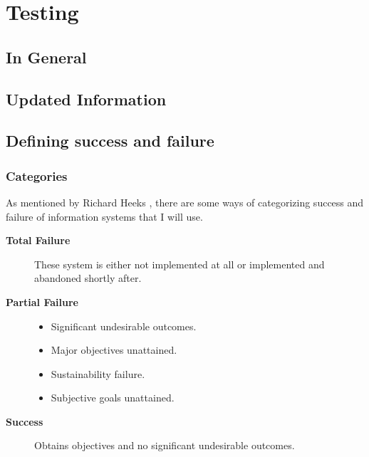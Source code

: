 \chapter{Testing}
\section{In General}

\section{Updated Information}

\section{Defining success and failure}
\subsection{Categories}
As mentioned by Richard Heeks \cite{rh:isdc}, there are some ways of categorizing success and failure of information systems that I will use.
\begin{description}
\item[\textbf{Total Failure}] These system is either not implemented at all or implemented and abandoned shortly after.
\item[\textbf{Partial Failure}]
	\begin{itemize}
		\item Significant undesirable outcomes.
		\item Major objectives unattained.
		\item Sustainability failure.
		\item Subjective goals unattained.
	\end{itemize}
\item[\textbf{Success}] Obtains objectives and no significant undesirable outcomes.
\end{description}